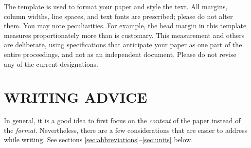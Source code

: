 \documentclass[letterpaper, 10 pt, conference]{ieeeconf}
\begin{document}
The template is used to format your paper and style the text. All margins, column widths, line spaces, and text fonts are prescribed; please do not alter them. You may note peculiarities. For example, the head margin in this template measures proportionately more than is customary. This measurement and others are deliberate, using specifications that anticipate your paper as one part of the entire proceedings, and not as an independent document. Please do not revise any of the current designations.

\section{WRITING ADVICE}

In general, it is a good idea to first focus on the \emph{content} of the paper instead of the \emph{format}. Nevertheless, there are a few considerations that are easier to address while writing. See sections \ref{sec:abbreviations}--\ref{sec:units} below.
\end{document}
